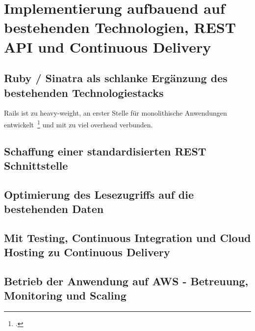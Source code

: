 \chapter{Implementierung aufbauend auf bestehenden Technologien, REST API und Continuous Delivery}

\section{Ruby / Sinatra als schlanke Ergänzung des bestehenden Technologiestacks}
Rails ist zu heavy-weight, an erster Stelle für monolithische Anwendungen entwickelt~\footcite[][]{rails:doctrine} und mit zu viel overhead verbunden.

\section{Schaffung einer standardisierten REST Schnittstelle}

\section{Optimierung des Lesezugriffs auf die bestehenden Daten}

\section{Mit Testing, Continuous Integration und Cloud Hosting zu Continuous Delivery}

\section{Betrieb der Anwendung auf AWS - Betreuung, Monitoring und Scaling}